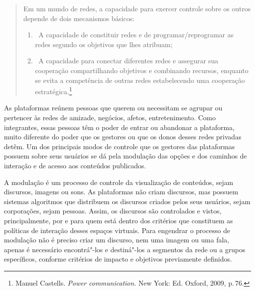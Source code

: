 

\begin{quote}
Em um mundo de redes, a capacidade para exercer controle sobre os outros
depende de dois mecanismos básicos:
\begin{enumerate}
\item\, A capacidade de constituir redes
e de programar/reprogramar as redes segundo os objetivos que lhes
atribuam;
\item\, A capacidade para conectar diferentes redes e assegurar
sua cooperação compartilhando objetivos e combinando recursos, enquanto
se evita a competência de outras redes estabelecendo uma cooperação
estratégica.\footnote{Manuel Castells. \emph{Power communication.} New York: Ed. Oxford,
2009, p.\,76.}
\end{enumerate}
\end{quote}

As plataformas reúnem pessoas que querem ou necessitam se agrupar ou
pertencer às redes de amizade, negócios, afetos, entretenimento. Como
integrantes, essas pessoas têm o poder de entrar ou abandonar a
plataforma, muito diferente do poder que os gestores ou que os donos
desses redes privadas detêm. Um dos principais modos de controle que os
gestores das plataformas possuem sobre seus usuários se dá pela
modulação das opções e dos caminhos de interação e de acesso aos
conteúdos publicados.

A modulação é um processo de controle da visualização de conteúdos,
sejam discursos, imagens ou sons. As plataformas não criam discursos,
mas possuem sistemas algoritmos que distribuem os discursos criados
pelos seus usuários, sejam corporações, sejam pessoas. Assim, os
discursos são controlados e vistos, principalmente, por e para quem está
dentro dos critérios que constituem as políticas de interação desses
espaços virtuais. Para engendrar o processo de modulação não é preciso
criar um discurso, nem uma imagem ou uma fala, apenas é necessário
encontrá"-los e destiná"-los a segmentos da rede ou a grupos específicos,
conforme critérios de impacto e objetivos previamente definidos.

